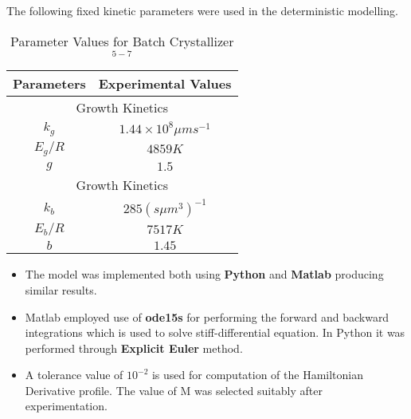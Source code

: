 The following fixed kinetic parameters were used in the deterministic modelling. 

\begin{center}
\begin{table}[!h]
\centering
\begin{tabular}{|c|c|}
\hline
Parameters & Experimental Values \\
\hline
\multicolumn{2}{|c|}{Growth Kinetics} \\
\hline
$k_{g}$ & $1.44\times10^{8} \mu m s^{-1}$ \\
$E_{g}/R$ & $4859K$ \\
$g$ & $1.5$ \\
\hline
\multicolumn{2}{|c|}{Growth Kinetics} \\
\hline
$k_{b}$ & $285 (s \mu m^{3})^{-1}$ \\ 
$E_{b}/R$ & $7517K$ \\
$b$ & $1.45$ \\
\hline
\end{tabular}
\caption{Parameter Values for Batch Crystallizer$^{5-7}$}
\label{Table1}
\end{table}
\end{center}

\begin{itemize}
\item The model was implemented both using \textbf{Python} and \textbf{Matlab} producing similar results. 
\item Matlab employed use of \textbf{ode15s} for performing the forward and backward integrations which is used to solve stiff-differential equation. In Python it was performed through \textbf{Explicit Euler} method.
\item A tolerance value of $10^{-2}$ is used for computation of the Hamiltonian Derivative profile. The value of M was selected suitably after experimentation. 

\end{itemize}



